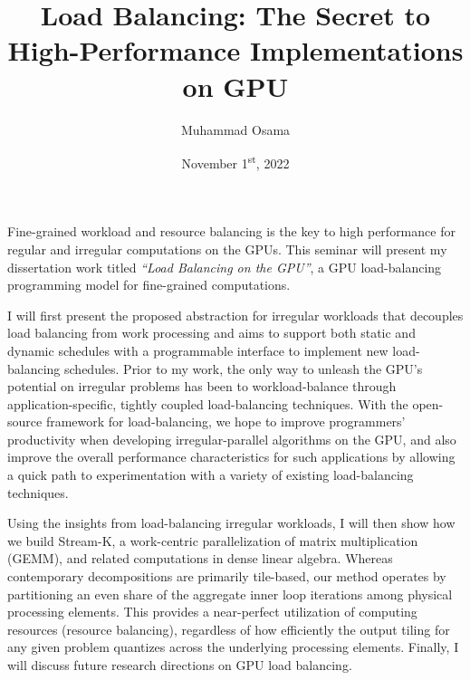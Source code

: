 \documentclass[12pt]{amsart}
\title{Load Balancing: The Secret to High-Performance Implementations on GPU}
\author{Muhammad Osama}
\date{November 1\textsuperscript{st}, 2022}
\begin{document}
\maketitle	

Fine-grained workload and resource balancing is the key to high performance for regular and irregular computations on the GPUs. This seminar will present my dissertation work titled \emph{``Load Balancing on the GPU''}, a GPU load-balancing programming model for fine-grained computations.

I will first present the proposed abstraction for irregular workloads that decouples load balancing from work processing and aims to support both static and dynamic schedules with a programmable interface to implement new load-balancing schedules. Prior to my work, the only way to unleash the GPU's potential on irregular problems has been to workload-balance through application-specific, tightly coupled load-balancing techniques. With the open-source framework for load-balancing, we hope to improve programmers' productivity when developing irregular-parallel algorithms on the GPU, and also improve the overall performance characteristics for such applications by allowing a quick path to experimentation with a variety of existing load-balancing techniques.

Using the insights from load-balancing irregular workloads, I will then show how we build Stream-K, a work-centric parallelization of matrix multiplication (GEMM), and related computations in dense linear algebra. Whereas contemporary decompositions are primarily tile-based, our method operates by partitioning an even share of the aggregate inner loop iterations among physical processing elements. This provides a near-perfect utilization of computing resources (resource balancing), regardless of how efficiently the output tiling for any given problem quantizes across the underlying processing elements. Finally, I will discuss future research directions on GPU load balancing.
\end{document}
